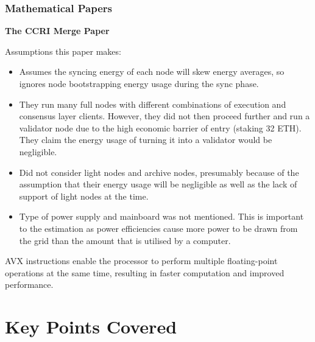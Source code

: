 
\subsubsection{Mathematical Papers}




\textbf{The CCRI Merge Paper } \cite{CryptoCarbonRatingsInstitute2022TheNetwork}

Assumptions this paper makes:
\begin{itemize}
    \item Assumes the syncing energy of each node will skew energy averages, so ignores node bootstrapping energy usage during the sync phase.
    
    \item They run many full nodes with different combinations of execution and consensus layer clients. However, they did not then proceed further and run a validator node due to the high economic barrier of entry (staking 32 ETH). They claim the energy usage of turning it into a validator would be negligible.
    
    \item Did not consider light nodes and archive nodes, presumably because of the assumption that their energy usage will be negligible as well as the lack of support of light nodes at the time.

    \item Type of power supply and mainboard was not mentioned. This is important to the estimation as power efficiencies cause more power to be drawn from the grid than the amount that is utilised by a computer.
\end{itemize}



AVX instructions enable the processor to perform multiple floating-point operations at the same time, resulting in faster computation and improved performance. \cite{Schuchart2016TheScale}



\section{Key Points Covered}
